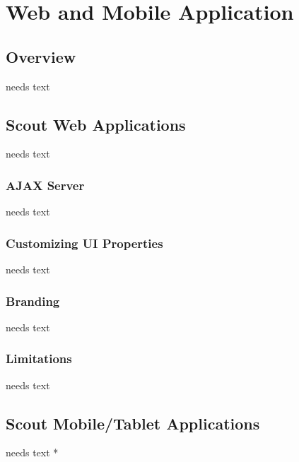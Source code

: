 \documentclass[a4paper,10pt,twoside]{book}
\begin{document}
  \sloppy
\fi


\chapter{Web and Mobile Application}

\section{Overview}
needs text

\section{Scout Web Applications}
needs text

\subsection{AJAX Server}
needs text

\subsection{Customizing UI Properties}
needs text

\subsection{Branding}
needs text

\subsection{Limitations}
needs text

  
\section{Scout Mobile/Tablet Applications}
needs text
  * 
  

\ifx\wholebook\relax\else
   
   
\end{document}
